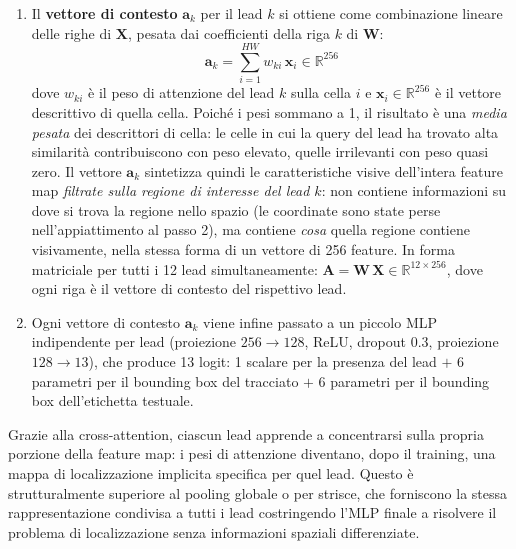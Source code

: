 \begin{enumerate}
    In forma matriciale, calcolando simultaneamente tutti i 12 lead:
    \[
        \mathbf{W} = \mathrm{softmax}\!\left(\frac{\mathbf{Q}\,\mathbf{X}^\top}{\sqrt{d}}\right) \in \mathbb{R}^{12 \times HW}
    \]
    dove $\mathbf{Q} \in \mathbb{R}^{12 \times 256}$ è la matrice delle 12 query, $\mathbf{X} \in \mathbb{R}^{HW \times 256}$ è la matrice delle celle spaziali e il softmax è applicato riga per riga. La riga $k$ di $\mathbf{W}$ è la \textit{mappa di attenzione} del lead $k$: un vettore di $HW$ pesi che indica, per ogni cella, quanto essa contribuisce alla rappresentazione di quel lead.

    \item Il \textbf{vettore di contesto} $\mathbf{a}_k$ per il lead $k$ si ottiene come combinazione lineare delle righe di $\mathbf{X}$, pesata dai coefficienti della riga $k$ di $\mathbf{W}$:
    \[
        \mathbf{a}_k = \sum_{i=1}^{HW} w_{ki}\,\mathbf{x}_i \in \mathbb{R}^{256}
    \]
    dove $w_{ki}$ è il peso di attenzione del lead $k$ sulla cella $i$ e $\mathbf{x}_i \in \mathbb{R}^{256}$ è il vettore descrittivo di quella cella. Poiché i pesi sommano a 1, il risultato è una \textit{media pesata} dei descrittori di cella: le celle in cui la query del lead ha trovato alta similarità contribuiscono con peso elevato, quelle irrilevanti con peso quasi zero. Il vettore $\mathbf{a}_k$ sintetizza quindi le caratteristiche visive dell'intera feature map \textit{filtrate sulla regione di interesse del lead $k$}: non contiene informazioni su dove si trova la regione nello spazio (le coordinate sono state perse nell'appiattimento al passo 2), ma contiene \textit{cosa} quella regione contiene visivamente, nella stessa forma di un vettore di 256 feature. In forma matriciale per tutti i 12 lead simultaneamente: $\mathbf{A} = \mathbf{W}\,\mathbf{X} \in \mathbb{R}^{12 \times 256}$, dove ogni riga è il vettore di contesto del rispettivo lead.

    \item Ogni vettore di contesto $\mathbf{a}_k$ viene infine passato a un piccolo MLP indipendente per lead (proiezione $256 \to 128$, ReLU, dropout 0.3, proiezione $128 \to 13$), che produce 13 logit: 1 scalare per la presenza del lead $+$ 6 parametri per il bounding box del tracciato $+$ 6 parametri per il bounding box dell'etichetta testuale.
\end{enumerate}

Grazie alla cross-attention, ciascun lead apprende a concentrarsi sulla propria porzione della feature map: i pesi di attenzione diventano, dopo il training, una mappa di localizzazione implicita specifica per quel lead. Questo è strutturalmente superiore al pooling globale o per strisce, che forniscono la stessa rappresentazione condivisa a tutti i lead costringendo l'MLP finale a risolvere il problema di localizzazione senza informazioni spaziali differenziate.

